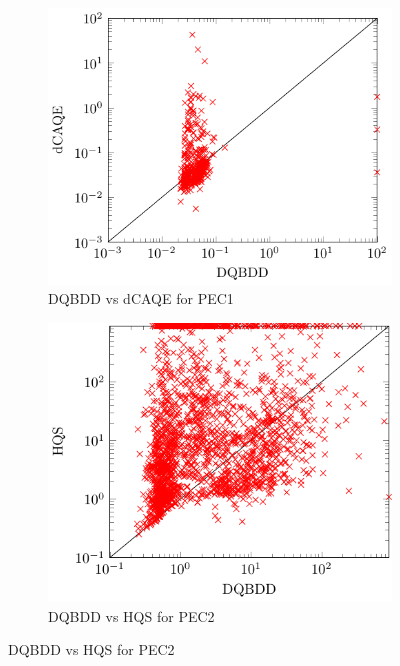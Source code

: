 \documentclass[
  digital, %
  color,
  twoside, %
  table,   %
  nolof,     %
  nolot,     %
]{fithesis3}
\theoremstyle{definition}
\theoremstyle{remark}
\begin{document}
\begin{figure}[p]
  \centering
  \begin{subfigure}{0.48\textwidth}
    \centering
    \includegraphics[width=\linewidth]{figures/PEC1dqbddVSdcaqe.pdf}
    \caption{DQBDD vs dCAQE for PEC1}
    \label{fig:PEC1dqbddVSdcaqe}
  \end{subfigure}
  \begin{subfigure}{0.48\textwidth}
    \centering
    \includegraphics[width=\linewidth]{figures/PEC2dqbddVShqs.pdf}
    \caption{DQBDD vs HQS for PEC2}
    \label{fig:PEC2dqbddVShqs}
  \end{subfigure}

\end{figure}
\end{document}
